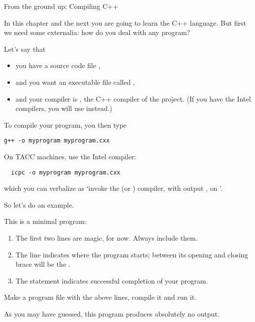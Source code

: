 
 {From the ground up: Compiling C++}

In this chapter and the next you are going to learn the C++
language. But first we need some externalia: how do you deal with any
program?

Let's say that
\begin{itemize}
\item you have a source code file ,
\item and you want an executable file called ,
\item and your compiler is , the C++ compiler of the
   project. (If you have the Intel compilers, you will
  use  instead.)
\end{itemize}
To compile your program, you then type
\begin{verbatim}
g++ -o myprogram myprogram.cxx
\end{verbatim}
\begin{tacc}
  On TACC machines, use the Intel compiler:
\begin{verbatim}
  icpc -o myprogram myprogram.cxx
\end{verbatim}
\end{tacc}

which you can verbalize as `invoke the  (or ) compiler,
with output , on '.

So let's do an example.

This is a minimal program:
%
%
\begin{enumerate}
\item The first two lines are magic, for now. Always include them.
\item The  line indicates where the program starts; between
  its opening and closing brace will be the
  .
\item The  statement indicates successful completion of your program.
\end{enumerate}
\begin{exercise}
  Make a program file with the above lines, compile it and run it.
\end{exercise}
As you may have guessed, this program produces absolutely no output.

